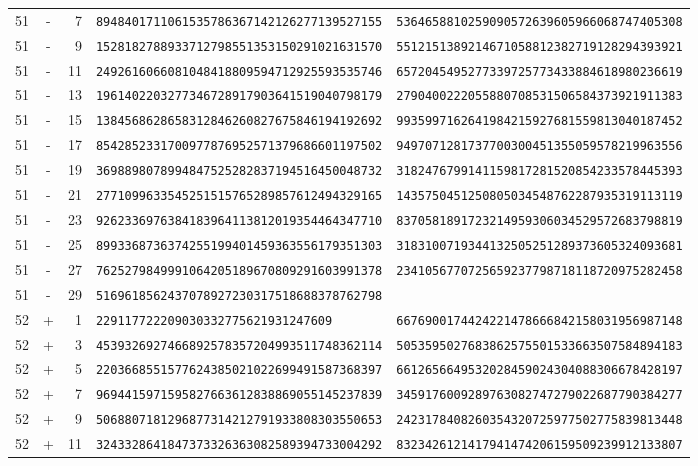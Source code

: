 \begin{longtable}{@{}rcrll@{}}
51&-&7&\texttt{8948401711061535786367142126277139527155}&\texttt{5364658810259090572639605966068747405308}\\
51&-&9&\texttt{1528182788933712798551353150291021631570}&\texttt{5512151389214671058812382719128294393921}\\
51&-&11&\texttt{2492616066081048418809594712925593535746}&\texttt{6572045495277339725773433884618980236619}\\
51&-&13&\texttt{1961402203277346728917903641519040798179}&\texttt{2790400222055880708531506584373921911383}\\
51&-&15&\texttt{1384568628658312846260827675846194192692}&\texttt{9935997162641984215927681559813040187452}\\
51&-&17&\texttt{8542852331700977876952571379686601197502}&\texttt{9497071281737700300451355059578219963556}\\
51&-&19&\texttt{3698898078994847525282837194516450048732}&\texttt{3182476799141159817281520854233578445393}\\
51&-&21&\texttt{2771099633545251515765289857612494329165}&\texttt{1435750451250805034548762287935319113119}\\
51&-&23&\texttt{9262336976384183964113812019354464347710}&\texttt{8370581891723214959306034529572683798819}\\
51&-&25&\texttt{8993368736374255199401459363556179351303}&\texttt{3183100719344132505251289373605324093681}\\
51&-&27&\texttt{7625279849991064205189670809291603991378}&\texttt{2341056770725659237798718118720975282458}\\
51&-&29&\texttt{5169618562437078927230317518688378762798}&\texttt{}\\
52&+&1&\texttt{229117722209030332775621931247609}&\texttt{6676900174424221478666842158031956987148}\\
52&+&3&\texttt{4539326927466892578357204993511748362114}&\texttt{5053595027683862575501533663507584894183}\\
52&+&5&\texttt{2203668551577624385021022699491587368397}&\texttt{6612656649532028459024304088306678428197}\\
52&+&7&\texttt{9694415971595827663612838869055145237839}&\texttt{3459176009289763082747279022687790384277}\\
52&+&9&\texttt{5068807181296877314212791933808303550653}&\texttt{2423178408260354320725977502775839813448}\\
52&+&11&\texttt{3243328641847373326363082589394733004292}&\texttt{8323426121417941474206159509239912133807}\\

\end{longtable}
